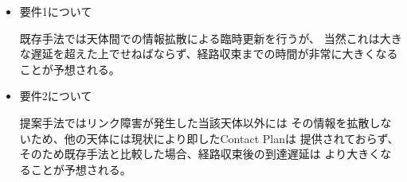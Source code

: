 \begin{itemize}
    \item 要件1について

    既存手法では天体間での情報拡散による臨時更新を行うが、
    当然これは大きな遅延を超えた上でせねばならず、経路収束までの時間が非常に大きくなることが予想される。
    
    \item 要件2について
    
    提案手法ではリンク障害が発生した当該天体以外には
    その情報を拡散しないため、他の天体には現状により即したContact Planは
    提供されておらず、そのため既存手法と比較した場合、経路収束後の到達遅延は
    より大きくなることが予想される。
    
\end{itemize}
